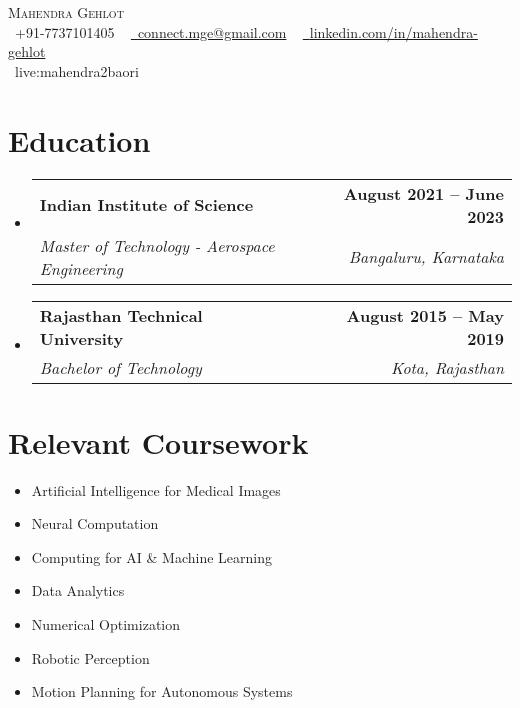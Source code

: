 \documentclass[letterpaper,11pt]{article}
\makeatletter
\newcommand{\resumeSubheading}[4]{
  \vspace{-2pt}\item
    \begin{tabular*}{1.0\textwidth}[t]{l@{\extracolsep{\fill}}r}
      \textbf{#1} & \textbf{\small #2} \\
      \textit{\small#3} & \textit{\small #4} \\
    \end{tabular*}\vspace{-7pt}
}
\newcommand{\resumeSubHeadingListStart}{\begin{itemize}[leftmargin=0.0in, label={}]}
\newcommand{\resumeSubHeadingListEnd}{\end{itemize}}
\makeatother
\begin{document}

\begin{center}
    {\Huge \scshape Mahendra Gehlot} \\ \vspace{8pt}
    \small \raisebox{-0.1\height}\faPhone\ +91-7737101405 ~ 
    \href{mailto:connect.mge@gmail.com}{\raisebox{-0.2\height}\faEnvelope\ {connect.mge@gmail.com}} ~
    \href{https://www.linkedin.com/in/mahendra-gehlot}{\raisebox{-0.2\height}\faLinkedin\ {linkedin.com/in/mahendra-gehlot}}  ~ 
    \vspace{4pt}
    \\{\faSkype\ {live:mahendra2baori}} ~
    \href{https://github.com/mahendra-gehlot}{\raisebox{-0.2\height}}  ~ 
    \vspace{-12pt}
\end{center}


\section{Education}
  \resumeSubHeadingListStart
    \resumeSubheading
      {Indian Institute of Science}{August 2021 -- June 2023}
      {Master of Technology - Aerospace Engineering}{Bangaluru, Karnataka}
  \resumeSubHeadingListEnd
  \resumeSubHeadingListStart
    \resumeSubheading
      {Rajasthan Technical University}{August 2015 -- May 2019}
      {Bachelor of Technology}{Kota, Rajasthan}
  \resumeSubHeadingListEnd
\vspace{-8pt}
\section{Relevant Coursework}
        \begin{multicols}{4}
            \begin{itemize}[itemsep=-5pt, parsep=8pt]
                \item\small Artificial Intelligence for Medical Images
                \item Neural Computation
                \item Computing for AI \& Machine Learning
                \item Data Analytics
                \item Numerical Optimization
                \item Robotic Perception
                \item Motion Planning for Autonomous Systems
            \end{itemize}
        \end{multicols}
\end{document}

